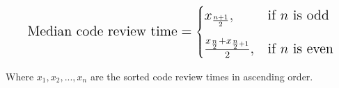 \begin{appendices}
\begin{equation}
\mathlarger{\mathlarger{
\text{Median code review time} = 
\begin{cases}
    x_{\frac{n+1}{2}}, & \text{if $n$ is odd} \\[2ex]
    \frac{x_{\frac{n}{2}} + x_{\frac{n}{2}+1}}{2}, & \text{if $n$ is even}
\end{cases}
}}
\end{equation}

Where $x_1, x_2, ..., x_n$ are the sorted code review times in ascending order.
\end{appendices}